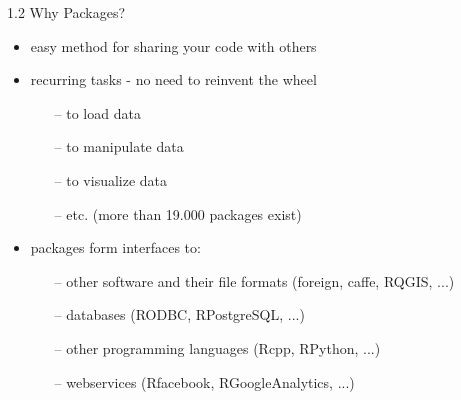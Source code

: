 \documentclass[11pt,a4paper]{beamer}
\begin{document}
	\begin{frame}[t]{1.2 Why Packages?}
		
	
		\begin{itemize}
			\item easy method for sharing your code with others 
			\item recurring tasks - no need to reinvent the wheel
			\begin{itemize}
				\item[--] to load data
				\item[--] to manipulate data
				\item[--] to visualize data
				\item[--] etc. (more than 19.000 packages exist)
			\end{itemize}
			\item packages form interfaces to:
			\begin{itemize}
				\item[--] other software and their file formats (foreign, caffe, RQGIS, ...)
				\item[--] databases (RODBC, RPostgreSQL, ...)
				\item[--] other programming languages (Rcpp, RPython, ...)
				\item[--] webservices (Rfacebook, RGoogleAnalytics, ...)
			\end{itemize}
		\end{itemize}
	
	\end{frame}




\end{document}
